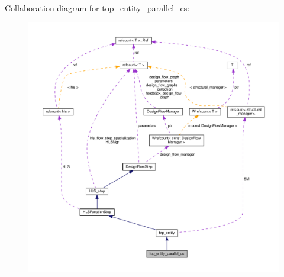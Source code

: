 Collaboration diagram for top\+\_\+entity\+\_\+parallel\+\_\+cs\+:
\nopagebreak
\begin{figure}[H]
\begin{center}
\leavevmode
\includegraphics[width=350pt]{d7/d8d/classtop__entity__parallel__cs__coll__graph}
\end{center}
\end{figure}
